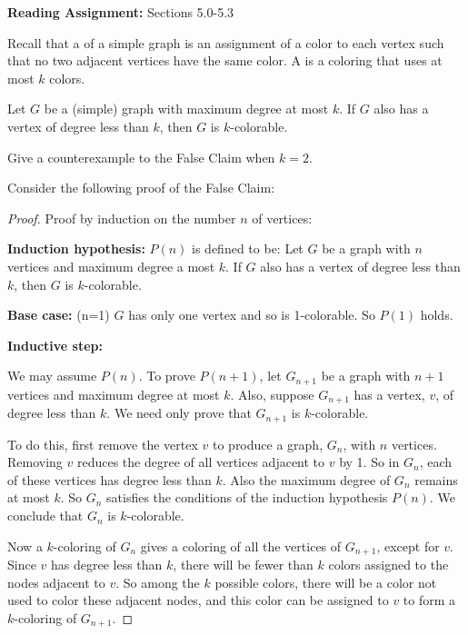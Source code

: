 \documentclass[12pt,twoside]{article}
\begin{document}
\noindent \textbf{Reading Assignment:}   Sections 5.0-5.3
\\

\begin{problem}{15}
Recall that a  of a simple graph is an assignment of a color
to each vertex such that no two adjacent vertices have the same color.  A
 is a coloring that uses at most $k$ colors.

\begin{falseclm*}
Let $G$ be a (simple) graph with maximum degree at most $k$.  If $G$ also
has a vertex of degree less than $k$, then $G$ is $k$-colorable.
\end{falseclm*}

\bparts {}\label{counterexample} Give a counterexample to the False
Claim when $k=2$. 


 Consider the following proof of the False Claim:

\begin{proof}

Proof by induction on the number $n$ of vertices:

{\bf Induction hypothesis:}
$P(n)$ is defined to be:  Let $G$ be a graph with $n$ vertices and maximum degree a most $k$.  If $G$ also has a vertex of degree less than $k$, then $G$ is $k$-colorable.

{\bf Base case:} (n=1) $G$ has only one vertex and so is 1-colorable.  So
$P(1)$ holds.

{\bf Inductive step:}

We may assume $P(n)$.  To prove $P(n+1)$, let $G_{n+1}$ be a graph with
$n+1$ vertices and maximum degree at most $k$.  Also, suppose $G_{n+1}$
has a vertex, $v$, of degree less than $k$.  We need only prove that
$G_{n+1}$ is $k$-colorable.

To do this, first remove the vertex $v$ to produce a graph, $G_n$, with
$n$ vertices.  Removing $v$ reduces the degree of all vertices adjacent to
$v$ by 1.  So in $G_n$, each of these vertices has degree less than $k$.
Also the maximum degree of $G_n$ remains at most $k$.  So $G_n$ satisfies
the conditions of the induction hypothesis $P(n)$.  We conclude that $G_n$
is $k$-colorable.

Now a $k$-coloring of $G_n$ gives a coloring of all the vertices of
$G_{n+1}$, except for $v$.  Since $v$ has degree less than $k$, there will
be fewer than $k$ colors assigned to the nodes adjacent to $v$.  So among
the $k$ possible colors, there will be a color not used to color these
adjacent nodes, and this color can be assigned to $v$ to form a
$k$-coloring of $G_{n+1}$.
\end{proof}


\end{problem}
\end{document}
